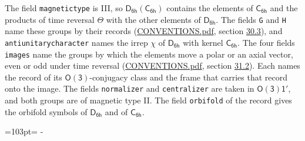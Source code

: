\documentclass[10pt,a4paper]{article}
\newcommand{\needspace}[1]{\par\penalty-100\begingroup\dimen0=#1\relax\dimen2=\pagegoal
  \advance\dimen2-\pagetotal\ifdim\dimen0>\dimen2\relax\ifdim\dimen2>0pt\vfil\break\fi\fi
  \endgroup}
\numberwithin{equation}{section}
\newcommand{\grp}[1]{\mathsf{#1}}
\begin{document}
The field \texttt{magnetictype} is III, so $\grp{D_{6h}}(\grp{C_{6h}})$ contains the elements of $\grp{C_{6h}}$ and the products of time reversal $\varTheta$ with the other elements of $\grp{D_{6h}}$. The fields \texttt{G} and \texttt{H} name these groups by their records (\href{../../CONVENTIONS.pdf}{CONVENTIONS.pdf}, section \href{../../CONVENTIONS.pdf\#conv.30.3}{30.3}), and \texttt{antiunitarycharacter} names the irrep $\chi$ of $\grp{D_{6h}}$ with kernel $\grp{C_{6h}}$. The four fields \texttt{images} name the groups by which the elements move a polar or an axial vector, even or odd under time reversal (\href{../../CONVENTIONS.pdf}{CONVENTIONS.pdf}, section \href{../../CONVENTIONS.pdf\#conv.31.2}{31.2}). Each names the record of its $\grp{O(3)}$-conjugacy class and the frame that carries that record onto the image. The fields \texttt{normalizer} and \texttt{centralizer} are taken in $\grp{O(3)1'}$, and both groups are of magnetic type II. The field \texttt{orbifold} of the record gives the orbifold symbols of $\grp{D_{6h}}$ and of $\grp{C_{6h}}$.
\needspace{103pt}
\end{document}
